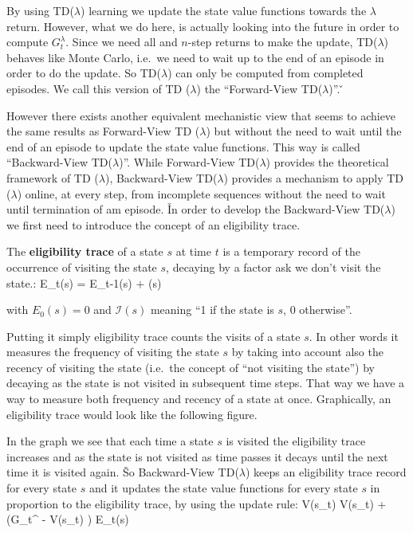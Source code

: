 By using TD($\lambda$) learning we update the state value functions towards the $\lambda$ return. However, what we do
here, is actually looking into the future in order to compute $G_t^\lambda$. Since we need all and $n$-step returns
to make the update, TD($\lambda$) behaves like Monte Carlo, i.e.\ we need to wait up to the end of an episode in order
to do the update. So TD($\lambda$) can only be computed from completed episodes. We call this version of TD
($\lambda$) the ``Forward-View TD($\lambda$)''. \v


However there exists another equivalent mechanistic view that seems to achieve the same results as Forward-View TD
($\lambda$) but without the need to wait until the end of an episode to update the state value functions. This way is
called ``Backward-View TD($\lambda$)''. While Forward-View TD($\lambda$) provides the theoretical framework of TD
($\lambda$), Backward-View TD($\lambda$) provides a mechanism to apply TD ($\lambda$) online, at every step, from
incomplete sequences without the need to wait until termination of am episode. \v

In order to develop the Backward-View TD($\lambda$) we first need to introduce the concept of an eligibility trace.

The \textbf{eligibility trace} of a state $s$ at time $t$ is a temporary record of the occurrence of visiting the
state $s$, decaying by a factor ask we don't visit the state.:
\bse
E_t(s) = \gamma \lambda E_{t-1}(s) + (s)
\ese

with $E_0(s) = 0$ and $\mathcal{I}(s)$ meaning ``1 if the state is $s$, 0 otherwise''.
\ed

Putting it simply eligibility trace counts the visits of a state $s$. In other words it measures the frequency of
visiting the state $s$ by taking into account also the recency of visiting the state (i.e.\ the concept of ``not
visiting the state'') by decaying as the state is not visited in subsequent time steps. That way we have a way to
measure both frequency and recency of a state at once. Graphically, an eligibility trace would look like the
following figure.


In the graph we see that each time a state $s$ is visited the eligibility trace increases and as the state is not
visited as time passes it decays until the next time it is visited again. \v

So Backward-View TD($\lambda$) keeps an eligibility trace record for every state $s$ and it updates the state value
functions for every state $s$ in proportion to the eligibility trace, by using the update rule:
\bse
V(s_t) \gets V(s_t) + \alpha \left(G_t^{\lambda} - V(s_t) \right) E_t(s)
\ese

